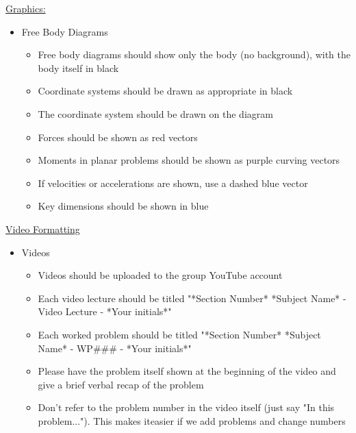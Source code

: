 \documentclass[a4paper]{article}
\begin{document}
\underline{Graphics:}
	\begin{itemize}
		\item Free Body Diagrams
			\begin{itemize}
				\item Free body diagrams should show only the body (no background), with the body itself in black
				\item Coordinate systems should be drawn as appropriate in black
				\item The coordinate system should be drawn on the diagram
				\item Forces should be shown as red vectors
				\item Moments in planar problems should be shown as purple curving vectors
				\item If velocities or accelerations are shown, use a dashed blue vector
				\item Key dimensions should be shown in blue
			\end{itemize}
	\end{itemize}

\underline{Video Formatting}
	\begin{itemize}
		\item Videos
			\begin{itemize}
				\item Videos should be uploaded to the group YouTube account
				\item Each video lecture should be titled "*Section Number* *Subject Name* - Video Lecture - *Your initials*"
				\item Each worked problem should be titled "*Section Number* *Subject Name* - WP\#\#\# - *Your initials*"
				\item Please have the problem itself shown at the beginning of the video and give a brief verbal recap of the problem
				\item Don't refer to the problem number in the video itself (just say "In this problem..."). This makes iteasier if we add problems and change numbers
		\end{itemize}
	\end{itemize}
\end{document}
